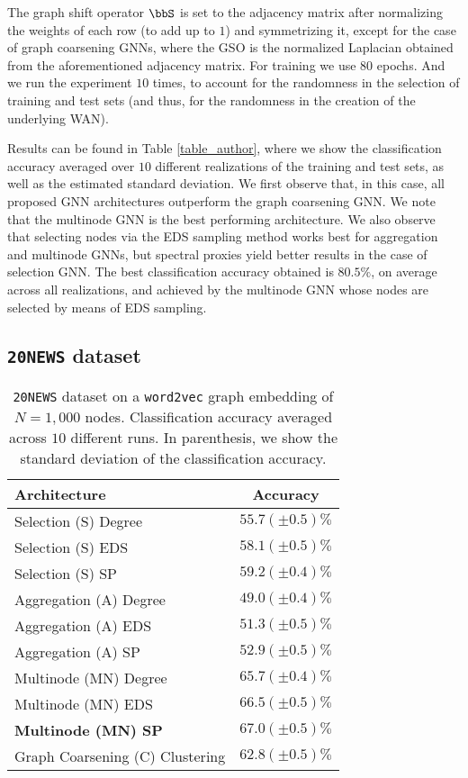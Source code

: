 The graph shift operator $\bbS$ is set to the adjacency matrix after normalizing the weights of each row (to add up to $1$) and symmetrizing it, except for the case of graph coarsening GNNs, where the GSO is the normalized Laplacian obtained from the aforementioned adjacency matrix. For training we use $80$ epochs. And we run the experiment $10$ times, to account for the randomness in the selection of training and test sets (and thus, for the randomness in the creation of the underlying WAN).

Results can be found in Table \ref{table_author}, where we show the classification accuracy averaged over $10$ different realizations of the training and test sets, as well as the estimated standard deviation. We first observe that, in this case, all proposed GNN architectures outperform the graph coarsening GNN. We note that the multinode GNN is the best performing architecture. We also observe that selecting nodes via the EDS sampling method works best for aggregation and multinode GNNs, but spectral proxies yield better results in the case of selection GNN. The best classification accuracy obtained is $80.5\%$, on average across all realizations, and achieved by the multinode GNN whose nodes are selected by means of EDS sampling.


\subsection{\texttt{20NEWS} dataset} \label{subsec_20news}

\begin{table}
	\centering
\begin{tabular}{lc} \hline
Architecture 				& Accuracy 				\\ \hline
Selection (S) Degree		& $55.7 (\pm 0.5) \%$	\\
Selection (S) EDS			& $58.1 (\pm 0.5) \%$	\\
Selection (S) SP			& $59.2 (\pm 0.4) \%$	\\
Aggregation	(A)	Degree		& $49.0 (\pm 0.4) \%$	\\
Aggregation	(A)	EDS			& $51.3 (\pm 0.5) \%$	\\
Aggregation	(A)	SP			& $52.9 (\pm 0.5) \%$	\\
Multinode (MN) Degree		& $65.7 (\pm 0.4) \%$	\\
Multinode (MN) EDS			& $66.5 (\pm 0.5) \%$	\\
\textbf{Multinode (MN) SP}			& $\mathbf{67.0 (\pm 0.5) \%}$	\\
Graph Coarsening (C) Clustering		& $62.8 (\pm 0.5)\%$ \\ \hline
\end{tabular}
	\caption{\texttt{20NEWS} dataset on a \texttt{word2vec} graph embedding of $N=1,000$ nodes. Classification accuracy averaged across $10$ different runs. In parenthesis, we show the standard deviation of the classification accuracy.}
	\label{table_20news}
\end{table}


